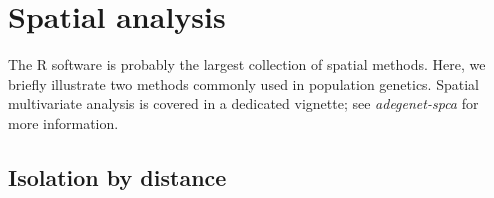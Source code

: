 \documentclass{article}
\begin{document}
\newpage
\section{Spatial analysis}

The R software is probably the largest collection of spatial methods.
Here, we briefly illustrate two methods commonly used in population genetics.
Spatial multivariate analysis is covered in a dedicated vignette; see \textit{adegenet-spca} for
more information.


\subsection{Isolation by distance}

\end{document}
